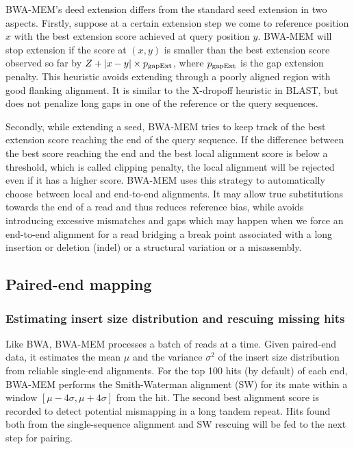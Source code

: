 \documentclass{bioinfo}
\begin{document}
\begin{methods}
BWA-MEM's deed extension differs from the standard seed extension in two
aspects. Firstly, suppose at a certain extension step we come to reference
position $x$ with the best extension score achieved at query position $y$.
BWA-MEM will stop extension if the score at $(x,y)$ is smaller than the best
extension score observed so far by $Z+|x-y|\times p_{\rm gapExt}$, where
$p_{\rm gapExt}$ is the gap extension penalty. This heuristic avoids extending
through a poorly aligned region with good flanking alignment. It is similar
to the X-dropoff heuristic in BLAST, but does not penalize long gaps in
one of the reference or the query sequences.

Secondly, while extending a seed, BWA-MEM tries to keep track of the best
extension score reaching the end of the query sequence. If the difference
between the best score reaching the end and the best local alignment score is
below a threshold, which is called clipping penalty, the local alignment will
be rejected even if it has a higher score. BWA-MEM uses this strategy to
automatically choose between local and end-to-end alignments. It may allow true
substitutions towards the end of a read and thus reduces reference bias, while
avoids introducing excessive mismatches and gaps which may happen when we force
an end-to-end alignment for a read bridging a break point associated with a
long insertion or deletion (indel) or a structural variation or a misassembly.

\subsection{Paired-end mapping}

\subsubsection{Estimating insert size distribution and rescuing missing hits}
Like BWA, BWA-MEM processes a batch of reads at a time.  Given paired-end data,
it estimates the mean $\mu$ and the variance $\sigma^2$ of the insert size
distribution from reliable single-end alignments. For the top 100 hits (by
default) of each end, BWA-MEM performs the Smith-Waterman alignment (SW) for
its mate within a window $[\mu-4\sigma,\mu+4\sigma]$ from the hit. The second
best alignment score is recorded to detect potential mismapping in a long
tandem repeat.  Hits found both from the single-sequence alignment and SW
rescuing will be fed to the next step for pairing.


\end{methods}
\end{document}
